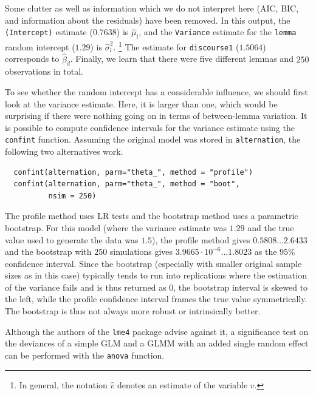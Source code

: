 \documentclass[a4paper,12pt]{article}
\begin{document}
Some clutter as well as information which we do not interpret here (AIC, BIC, and information about the residuals) have been removed.
In this output, the \texttt{(Intercept)} estimate ($0.7638$) is $\hat{\mu}_l$, and the \texttt{Variance} estimate for the \texttt{lemma} random intercept ($1.29$) is $\hat{\sigma}_l^2$.%
\footnote{In general, the notation $\hat{v}$ denotes an estimate of the variable $v$.}
The estimate for \texttt{discourse1} ($1.5064$) corresponds to $\hat{\beta}_d$.
Finally, we learn that there were five different lemmas and $250$ observations in total.

To see whether the random intercept has a considerable influence, we should first look at the variance estimate.
Here, it is larger than one, which would be surprising if there were nothing going on in terms of between-lemma variation.
It is possible to compute confidence intervals for the variance estimate using the \texttt{confint} function.
Assuming the original model was stored in \texttt{alternation}, the following two alternatives work.

\vspace{0.5\baselineskip}

\begin{lstlisting}
  confint(alternation, parm="theta_", method = "profile")
  confint(alternation, parm="theta_", method = "boot",
          nsim = 250)
\end{lstlisting}

The profile method uses LR tests and the bootstrap method uses a parametric bootstrap.
For this model (where the variance estimate was $1.29$ and the true value used to generate the data was $1.5$), the profile method gives $0.5808\dots2.6433$ and the bootstrap with $250$ simulations gives $3.9665\cdot10^{-6}\dots1.8023$ as the $95\%$ confidence interval.
Since the bootstrap (especially with smaller original sample sizes as in this case) typically tends to run into replications where the estimation of the variance fails and is thus returned as $0$, the bootstrap interval is skewed to the left, while the profile confidence interval frames the true value symmetrically.
The bootstrap is thus not always more robust or intrinsically better.

Although the authors of the \texttt{lme4} package advise against it, a significance test on the deviances of a simple GLM and a GLMM with an added single random effect can be performed with the \texttt{anova} function.

\vspace{0.5\baselineskip}
\end{document}
